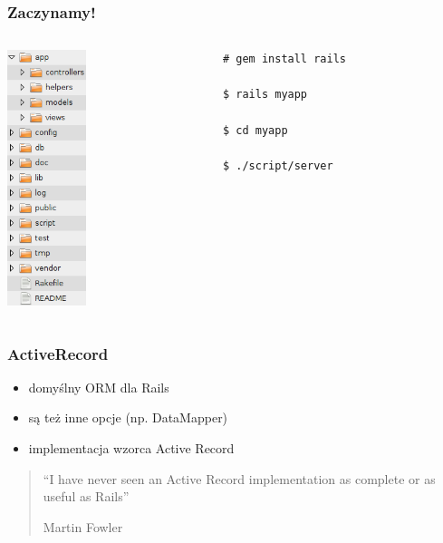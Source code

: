 \documentclass[12t]{beamer}
\begin{document}
\begin{frame}[fragile]
  \frametitle{Zaczynamy!}
  \begin{columns}[T]
    \begin{column}{2.3cm}
      \includegraphics[width=2.3cm]{structure.png}
    \end{column}
    \begin{column}{7.5cm}
\begin{verbatim}
# gem install rails

$ rails myapp

$ cd myapp

$ ./script/server
\end{verbatim}
    \end{column}
  \end{columns}
\end{frame}

\begin{frame}
  \frametitle{ActiveRecord}
  \begin{itemize}
  \item domyślny ORM dla Rails
  \item są też inne opcje (np. DataMapper)
  \item implementacja wzorca Active Record
  \end{itemize}
\end{frame}

\begin{frame}
  \begin{quote}
    “I have never seen an Active Record implementation as complete or as useful as Rails”

    \hfill Martin Fowler
  \end{quote}
\end{frame}
\end{document}
